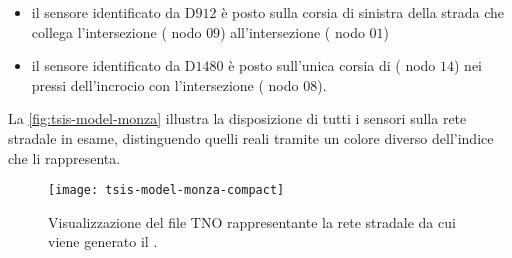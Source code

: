 \begin{itemize}
\item il sensore identificato da D$912$ è posto sulla corsia di sinistra della strada che collega l'intersezione  (\ie{} nodo $09$) all'intersezione  (\ie{} nodo $01$)
\item il sensore identificato da D$1480$ è posto sull'unica corsia di  (\ie{} nodo $14$) nei pressi dell'incrocio con l'intersezione  (\ie{} nodo $08$).
\end{itemize}
La \vref{fig:tsis-model-monza} illustra la disposizione di tutti i sensori sulla rete stradale in esame, distinguendo quelli reali tramite un colore diverso dell'indice che li rappresenta.

\cleardoublepage
\begin{figure}[H]
  	\centering
  	\texttt{[image: tsis-model-monza-compact]}%
  	\caption[Rete stradale relativa al ]{Visualizzazione del file \acs{TNO} rappresentante la rete stradale da cui viene generato il .}
	\label{fig:tsis-model-monza}
\end{figure}

